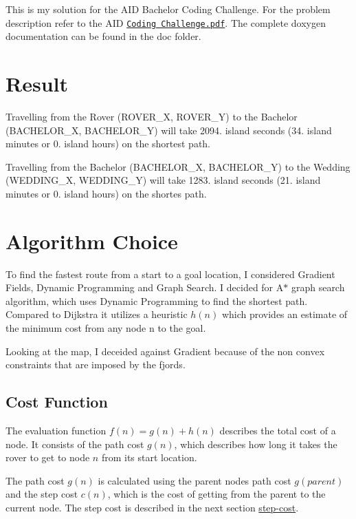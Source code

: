 This is my solution for the A\+ID Bachelor Coding Challenge. For the problem description refer to the A\+ID \href{../../AID Coding Challenge.pdf}{\tt Coding Challenge.\+pdf}. The complete doxygen documentation can be found in the doc folder.

\section*{Result}

Travelling from the Rover (R\+O\+V\+E\+R\+\_\+X, R\+O\+V\+E\+R\+\_\+Y) to the Bachelor (B\+A\+C\+H\+E\+L\+O\+R\+\_\+X, B\+A\+C\+H\+E\+L\+O\+R\+\_\+Y) will take 2094. island seconds (34. island minutes or 0. island hours) on the shortest path.

Travelling from the Bachelor (B\+A\+C\+H\+E\+L\+O\+R\+\_\+X, B\+A\+C\+H\+E\+L\+O\+R\+\_\+Y) to the Wedding (W\+E\+D\+D\+I\+N\+G\+\_\+X, W\+E\+D\+D\+I\+N\+G\+\_\+Y) will take 1283. island seconds (21. island minutes or 0. island hours) on the shortes path.



\section*{Algorithm Choice}

To find the fastest route from a start to a goal location, I considered Gradient Fields, Dynamic Programming and Graph Search. I decided for A$\ast$ graph search algorithm, which uses Dynamic Programming to find the shortest path. Compared to Dijkstra it utilizes a heuristic $h(n)$ which provides an estimate of the minimum cost from any node n to the goal.

Looking at the map, I deceided against Gradient because of the non convex constraints that are imposed by the fjords.

\subsection*{Cost Function}

The evaluation function $f(n) = g(n) + h(n)$ describes the total cost of a node. It consists of the path cost $g(n)$, which describes how long it takes the rover to get to node $n$ from its start location.

The path cost $g(n)$ is calculated using the parent node\textquotesingle{}s path cost $g(parent)$ and the step cost $c(n)$, which is the cost of getting from the parent to the current node. The step cost is described in the next section \mbox{\hyperlink{index_step-cost}{step-\/cost}}.

